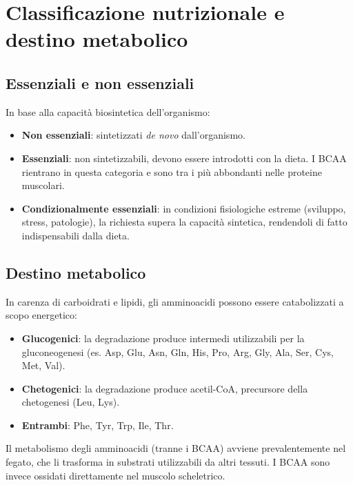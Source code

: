 \documentclass[12pt,a4paper]{report}
\begin{document}
\section{Classificazione nutrizionale e destino metabolico}
\subsection{Essenziali e non essenziali}
In base alla capacità biosintetica dell'organismo:
\begin{itemize}
\item \textbf{Non essenziali}: sintetizzati \textit{de novo} dall'organismo.
\item \textbf{Essenziali}: non sintetizzabili, devono essere introdotti con la dieta. I BCAA rientrano in questa categoria e sono tra i più abbondanti nelle proteine muscolari.
\item \textbf{Condizionalmente essenziali}: in condizioni fisiologiche estreme (sviluppo, stress, patologie), la richiesta supera la capacità sintetica, rendendoli di fatto indispensabili dalla dieta.
\end{itemize}

\subsection{Destino metabolico}
In carenza di carboidrati e lipidi, gli amminoacidi possono essere catabolizzati a scopo energetico:
\begin{itemize}
\item \textbf{Glucogenici}: la degradazione produce intermedi utilizzabili per la gluconeogenesi (es. Asp, Glu, Asn, Gln, His, Pro, Arg, Gly, Ala, Ser, Cys, Met, Val).
\item \textbf{Chetogenici}: la degradazione produce acetil-CoA, precursore della chetogenesi (Leu, Lys).
\item \textbf{Entrambi}: Phe, Tyr, Trp, Ile, Thr.
\end{itemize}
Il metabolismo degli amminoacidi (tranne i BCAA) avviene prevalentemente nel fegato, che li trasforma in substrati utilizzabili da altri tessuti. I BCAA sono invece ossidati direttamente nel muscolo scheletrico.
\end{document}
